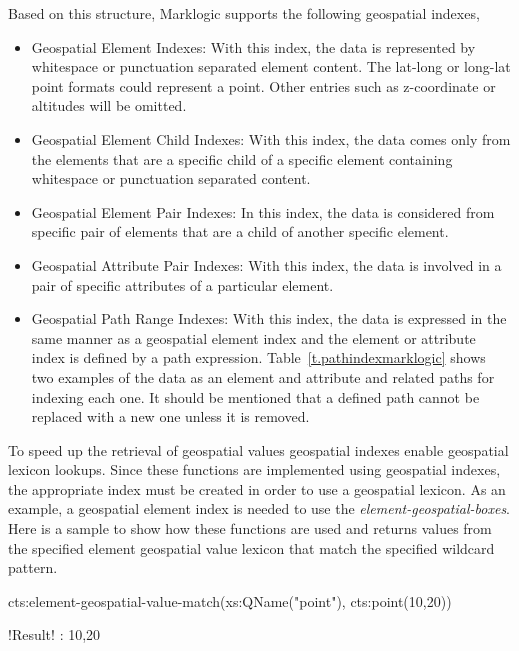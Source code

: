 \documentclass[a4paper,12pt]{article}
\begin{document}
\vspace{10px}
Based on this structure, Marklogic supports the following geospatial indexes,
\begin{itemize}
\item Geospatial Element Indexes: With this index, the data is represented by whitespace or punctuation separated element content. The lat-long or long-lat point formats could represent a point. Other entries such as z-coordinate or altitudes will be omitted.
\item Geospatial Element Child Indexes: With this index, the data comes only from the elements that are a specific child of a specific element containing whitespace or punctuation separated content.
\item Geospatial Element Pair Indexes: In this index, the data is considered from specific pair of elements that are a child of another specific element.
\item Geospatial Attribute Pair Indexes: With this index, the data is involved in a pair of specific attributes of a particular element.
\item Geospatial Path Range Indexes: With this index, the data is expressed in the same manner as a geospatial element index and the element or attribute index is defined by a path expression. Table~\ref{t.pathindexmarklogic} shows two examples of the data as an element and attribute and related paths for indexing each one. It should be mentioned that a defined path cannot be replaced with a new one unless it is removed.
\end{itemize}

To speed up the retrieval of geospatial values geospatial indexes enable geospatial lexicon lookups. Since these functions are implemented using geospatial indexes, the appropriate index must be created in order to use a geospatial lexicon. As an example, a geospatial element index is needed to use the \textit{element-geospatial-boxes}. Here is a sample to show how these functions are used and returns values from the specified element geospatial value lexicon that match the specified wildcard pattern.
\vspace{10px}
\begin{fakeJSON}[escapechar=\!]
cts:element-geospatial-value-match(xs:QName("point"),
cts:point(10,20))

!\colorbox{light-gray}{Result}! : 10,20
\end{fakeJSON}
\vspace{10px}

\end{document}
